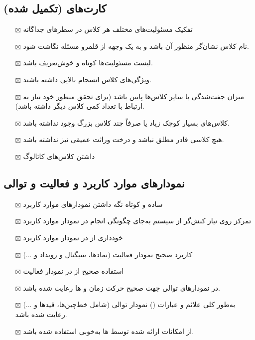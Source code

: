 \subsection{\hspace*{0.2cm}کارت‌های  (تکمیل شده)}

\begin{itemize} \setlength\itemsep{0cm}
	\item[$\boxtimes$]
	تفکیک مسئولیت‌های مختلف هر کلاس در سطرهای جداگانه
	\item[$\boxtimes$]
	نام کلاس نشان‌گر منظور آن باشد و به یک وجهه از قلمرو مسئله نگاشت شود.
	\item[$\boxtimes$]
	لیست مسئولیت‌ها کوتاه و خوش‌تعریف باشد.
	\item[$\boxtimes$]
	ویژگی‌های کلاس انسجام بالایی داشته باشند.
	\item[$\boxtimes$]
	میزان جفت‌شدگی با سایر کلاس‌ها پایین باشد (برای تحقق منظور خود نیاز به ارتباط با تعداد کمی کلاس دیگر داشته باشد).
	\item[$\boxtimes$]
	کلاس‌های بسیار کوچک زیاد یا صرفاً چند کلاس بزرگ وجود نداشته باشد.
	\item[$\boxtimes$]
	هیچ کلاسی قادر مطلق نباشد و درخت وراثت عمیقی نیز نداشته باشد.
	\item[$\boxtimes$]
	داشتن کلاس‌های کاتالوگ
\end{itemize}

\subsection{\hspace*{0.2cm}نمودارهای موارد کاربرد و فعالیت و توالی}

\begin{itemize} \setlength\itemsep{0cm}
	\item[$\boxtimes$]
	ساده و کوتاه نگه داشتن نمودارهای موارد کاربرد
	\item[$\boxtimes$]
	تمرکز روی نیاز کنش‌گر از سیستم به‌جای چگونگی انجام در نمودار موارد کاربرد
	\item[$\boxtimes$]
	خودداری از  در نمودار موارد کاربرد
	\item[$\boxtimes$]
	کاربرد صحیح  نمودار فعالیت (نمادها، سیگنال و رویداد و ...)
	\item[$\boxtimes$]
	استفاده صحیح از  در نمودار فعالیت
	\item[$\boxtimes$]
	در نمودارهای توالی جهت صحیح حرکت زمان و ها رعایت شده باشد.
	\item[$\boxtimes$]
	به‌طور کلی علائم و عبارات () نمودار توالی (شامل خط‌چین‌ها، قیدها و ...) رعایت شده باشد.
	\item[$\boxtimes$]
	از امکانات ارائه شده توسط ها به‌خوبی استفاده شده باشد.
	
\end{itemize}

